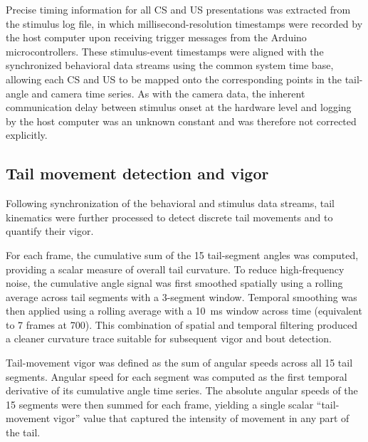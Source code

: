 Precise timing information for all CS and US presentations was extracted from the stimulus log file, in which millisecond-resolution timestamps were recorded by the host computer upon receiving trigger messages from the Arduino microcontrollers. These stimulus-event timestamps were aligned with the synchronized behavioral data streams using the common system time base, allowing each CS and US to be mapped onto the corresponding points in the tail-angle and camera time series. As with the camera data, the inherent communication delay between stimulus onset at the hardware level and logging by the host computer was an unknown constant and was therefore not corrected explicitly.

\subsection{Tail movement detection and vigor}

Following synchronization of the behavioral and stimulus data streams, tail kinematics were further processed to detect discrete tail movements and to quantify their vigor.

For each frame, the cumulative sum of the 15 tail-segment angles was computed, providing a scalar measure of overall tail curvature. To reduce high-frequency noise, the cumulative angle signal was first smoothed spatially using a rolling average across tail segments with a 3-segment window. Temporal smoothing was then applied using a rolling average with a \SI{10}{\milli\second} window across time (equivalent to 7 frames at \SI{700}{\fps}). This combination of spatial and temporal filtering produced a cleaner curvature trace suitable for subsequent vigor and bout detection.

Tail-movement vigor was defined as the sum of angular speeds across all 15 tail segments. Angular speed for each segment was computed as the first temporal derivative of its cumulative angle time series. The absolute angular speeds of the 15 segments were then summed for each frame, yielding a single scalar ``tail-movement vigor'' value that captured the intensity of movement in any part of the tail.

